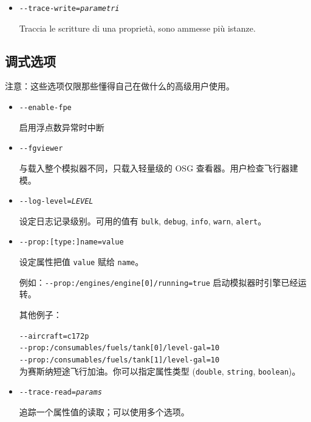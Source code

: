 \begin{itemize}
{\begin{itemize}
  \item{\texttt{-$ $-trace-write={\it parametri}}}

  Traccia le scritture di una propriet\`{a}, sono ammesse pi\`{u} istanze.
  \end{itemize}
}

\ifchinese
{
  \subsection{调式选项}
注意：这些选项仅限那些懂得自己在做什么的高级用户使用。

  \begin{itemize}

  \item{\texttt{-$ $-enable-fpe}}
 
   启用浮点数异常时中断

  \item{\texttt{-$ $-fgviewer}}
  
   与载入整个模拟器不同，只载入轻量级的 OSG 查看器。用户检查飞行器建模。

  \item{\texttt{-$ $-log-level={\it LEVEL}}}

   设定日志记录级别。可用的值有 \texttt{bulk}, \texttt{debug}, \texttt{info}, \texttt{warn}, \texttt{alert}。

  \item{\texttt{-$ $-prop:[type:]name=value}}

   设定属性把值 \texttt{value} 赋给  \texttt{name}。

  例如：\texttt{-$ $-prop:/engines/engine[0]/running=true} 启动模拟器时引擎已经运转。

  其他例子：

  \texttt{-$ $-aircraft=c172p}\\
  \texttt{-$ $-prop:/consumables/fuels/tank[0]/level-gal=10}\\
  \texttt{-$ $-prop:/consumables/fuels/tank[1]/level-gal=10}\\

  为赛斯纳短途飞行加油。你可以指定属性类型 (\texttt{double}, \texttt{string}, \texttt{boolean})。

 \item{\texttt{-$ $-trace-read={\it params}}}
  
   追踪一个属性值的读取；可以使用多个选项。


\end{itemize}}
\end{itemize}

